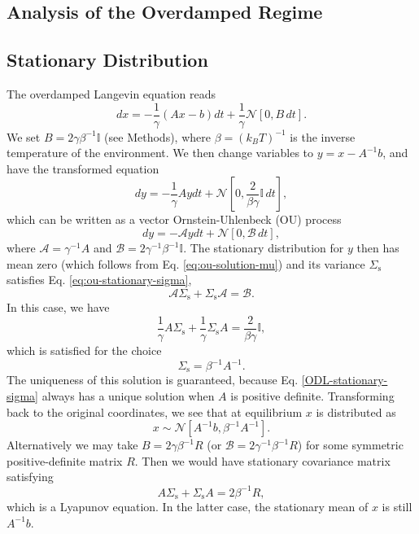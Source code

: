 \documentclass[prx,onecolumn,floatfix,longbibliography,notitlepage, nofootinbib,12pt]{revtex4-2}
\begin{document}
\begin{appendix}
\section{Analysis of the Overdamped Regime}

\subsection{Stationary Distribution}
The overdamped Langevin equation reads
\begin{equation}
    \label{eq:ODL-app}
    dx = - \frac{1}{\gamma}(A x - b) dt + \frac{1}{\gamma}\mathcal{N}\left[0,B\, dt\right].
\end{equation}
We set $B = 2 \gamma \beta^{-1} \mathbb{I}$ (see Methods), where $\beta =(k_B T)^{-1}$ is the inverse temperature of the environment. We then change variables to $y = x - A^{-1}b$, and have the transformed equation
\begin{equation}
    \label{ODL-transformed-app}
    dy = - \frac{1}{\gamma}A y dt + \mathcal{N}\left[0, \frac{2}{\beta \gamma} \mathbb{I}\, dt\right],
\end{equation}
which can be written as a vector Ornstein-Uhlenbeck (OU) process \cite{gardiner1985handbook}
\begin{equation}
    \label{ODL-transformed-app}
    dy = - \mathcal{A} y dt + \mathcal{N}[0, \mathcal{B}\, dt],
\end{equation}
where $\mathcal{A} = \gamma^{-1}A$ and $\mathcal{B} = 2 \gamma^{-1}\beta^{-1}\mathbb{I}$. The stationary distribution for $y$ then has mean zero (which follows from Eq. \eqref{eq:ou-solution-mu}) and its variance $\Sigma_\text{s}$ satisfies Eq. \eqref{eq:ou-stationary-sigma},
\begin{equation}
    \mathcal{A} \Sigma_\text{s} + \Sigma_\text{s} \mathcal{A} = \mathcal{B}.
\end{equation}
In this case, we have
\begin{equation}
    \frac{1}{\gamma}A \Sigma_\text{s} + \frac{1}{\gamma}\Sigma_\text{s} A = \frac{2}{\beta \gamma}\mathbb{I},
\end{equation}
which is satisfied for the choice
\begin{equation}
    \label{ODL-stationary-sigma}
    \Sigma_\text{s} = \beta^{-1} A^{-1}.
\end{equation}
The uniqueness of this solution is guaranteed, because Eq. \eqref{ODL-stationary-sigma} always has a unique solution when $A$ is positive definite. Transforming back to the original coordinates, we see that at equilibrium $x$ is distributed as
\begin{equation}
\label{eq:stationary-x-linear-system}
    x \sim \mathcal{N}[A^{-1}b, \beta^{-1} A^{-1}].
\end{equation}
Alternatively we may take $B = 2\gamma\beta^{-1}R$ (or $\mathcal{B} = 2\gamma^{-1} \beta^{-1}R$) for some symmetric positive-definite matrix $R$. Then we would have stationary covariance matrix satisfying
\begin{equation}
    A \Sigma_\text{s} +\Sigma_\text{s} A =2\beta^{-1}R,
\end{equation}
which is a Lyapunov equation. In the latter case, the stationary mean of $x$ is still $A^{-1} b$.

\end{appendix}
\end{document}
